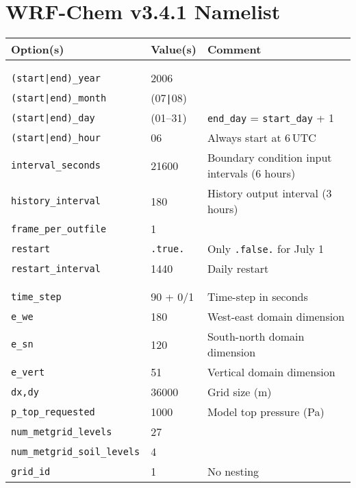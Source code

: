 \chapter{WRF-Chem v3.4.1 Namelist} \label{apdx:namelist}

\ifpdf
    \graphicspath{{Appendix/figures/PNG/}{Appendix/figures/PDF/}{Appendix/figures/}}
\else
    \graphicspath{{Appendix/figures/EPS/}{Appendix/figures/}}
\fi
\begin{singlespacing}
\begin{longtable}{p{2.0in}p{0.9in}p{3.2in}}
{\bf Option(s)} & {\bf Value(s)} & {\bf Comment} \\ \hline  \\
\hspace{-.2in}{\tt \&time\_control} \\
{\tt (start|end)\_year} & 2006 \\
{\tt (start|end)\_month} & (07{\tt|}08) \\
{\tt (start|end)\_day} & (01--31) & {\tt end\_day} = {\tt start\_day} + 1 \\
{\tt (start|end)\_hour} & 06 & Always start at 6\,\unit{UTC} \\
{\tt interval\_seconds} & 21600 & Boundary condition input intervals (6 hours) \\
{\tt history\_interval} & 180 & History output interval (3 hours) \\
{\tt frame\_per\_outfile} & 1 \\
{\tt restart} & {\tt .true.} & Only {\tt .false.} for July 1 \\
{\tt restart\_interval} & 1440 & Daily restart \\
\\
\hspace{-.2in}{\tt \&domains} \\
{\tt time\_step} & 90 + 0/1 & Time-step in seconds \\
{\tt e\_we} & 180 & West-east domain dimension \\
{\tt e\_sn} & 120 & South-north domain dimension \\
{\tt e\_vert} & 51 & Vertical domain dimension \\
{\tt dx,dy} & 36000 & Grid size (\unit{m}) \\
{\tt p\_top\_requested} & 1000 & Model top pressure (\unit{Pa}) \\
{\tt num\_metgrid\_levels} & 27 \\
{\tt num\_metgrid\_soil\_levels} & 4 \\
{\tt grid\_id} & 1 & No nesting \\

\end{longtable}
\end{singlespacing}
